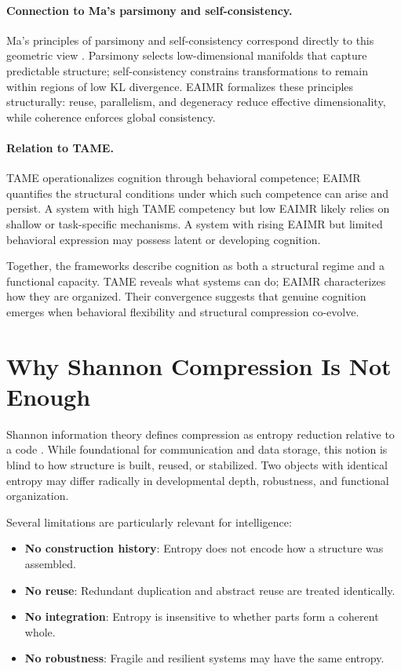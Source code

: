 \documentclass[11pt,letterpaper]{article}
\begin{document}
\paragraph{Connection to Ma’s parsimony and self-consistency.}
Ma’s principles of parsimony and self-consistency correspond directly to this 
geometric view \cite{ma2023}. Parsimony selects low-dimensional manifolds that 
capture predictable structure; self-consistency constrains transformations to 
remain within regions of low KL divergence. EAIMR formalizes these principles 
structurally: reuse, parallelism, and degeneracy reduce effective dimensionality, 
while coherence enforces global consistency.

\paragraph{Relation to TAME.}
TAME operationalizes cognition through behavioral competence; EAIMR quantifies 
the structural conditions under which such competence can arise and persist. 
A system with high TAME competency but low EAIMR likely relies on shallow or 
task-specific mechanisms. A system with rising EAIMR but limited behavioral 
expression may possess latent or developing cognition.

Together, the frameworks describe cognition as both a structural regime and a 
functional capacity. TAME reveals what systems can do; EAIMR characterizes how 
they are organized. Their convergence suggests that genuine cognition emerges 
when behavioral flexibility and structural compression co-evolve.


\section{Why Shannon Compression Is Not Enough}

Shannon information theory defines compression as entropy reduction relative to a code \parencite{shannon1948}. While foundational for communication and data storage, this notion is blind to how structure is built, reused, or stabilized. Two objects with identical entropy may differ radically in developmental depth, robustness, and functional organization.

Several limitations are particularly relevant for intelligence:
\begin{itemize}
\item \textbf{No construction history}: Entropy does not encode how a structure was assembled.
\item \textbf{No reuse}: Redundant duplication and abstract reuse are treated identically.
\item \textbf{No integration}: Entropy is insensitive to whether parts form a coherent whole.
\item \textbf{No robustness}: Fragile and resilient systems may have the same entropy.
\end{itemize}
\end{document}
